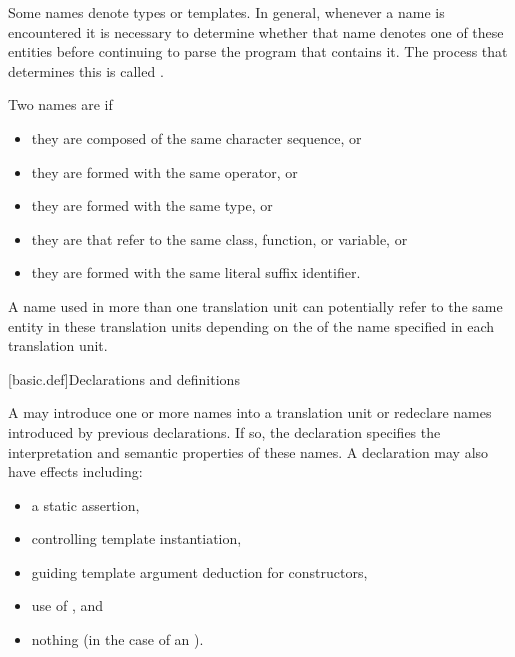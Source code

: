 \pnum
Some names denote types or templates. In general,
whenever a name is encountered it is necessary to determine whether that name denotes
one of these entities before continuing to parse the program that contains it. The
process that determines this is called
.

\pnum
Two names are  if
\begin{itemize}
\item they are  composed of the same character sequence, or
\item they are  formed with
the same operator, or
\item they are  formed
with the same type, or
\item they are  that refer to the same class,
function, or variable, or
\item they are  formed with
the same literal suffix identifier.
\end{itemize}

\pnum
{}%
%
A name used in more than one translation unit can potentially
refer to the same entity in these translation units depending on the
 of the name specified in each
translation unit.

[basic.def]{Declarations and definitions}

\pnum
{}%
%
%
A  may introduce
one or more names into a translation
unit or redeclare names introduced by previous declarations.
If so, the
declaration specifies the interpretation and semantic properties of these names.
A declaration may also have effects including:
\begin{itemize}
\item a static assertion,
\item controlling template instantiation,
\item guiding template argument deduction for constructors,
\item use of , and
\item nothing (in the case of an ).
\end{itemize}

